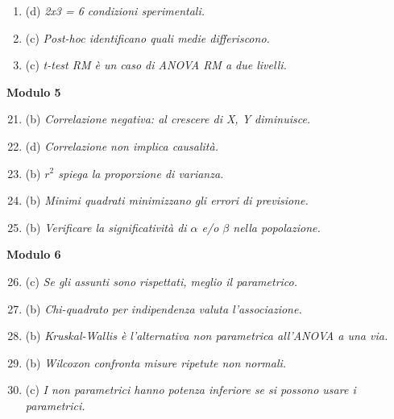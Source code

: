 \documentclass[12pt, a4paper]{article}
\begin{document}
\begin{footnotesize}
\begin{multicols}{2}
\begin{enumerate}
    \item (d) \textit{2x3 = 6 condizioni sperimentali.}
    \item (c) \textit{Post-hoc identificano quali medie differiscono.}
    \item (c) \textit{t-test RM è un caso di ANOVA RM a due livelli.}
\end{enumerate}
\vspace{0.5cm}
\textbf{Modulo 5}
\begin{enumerate}
    \setcounter{enumi}{20}
    \item (b) \textit{Correlazione negativa: al crescere di X, Y diminuisce.}
    \item (d) \textit{Correlazione non implica causalità.}
    \item (b) \textit{$r^2$ spiega la proporzione di varianza.}
    \item (b) \textit{Minimi quadrati minimizzano gli errori di previsione.}
    \item (b) \textit{Verificare la significatività di $\alpha$ e/o $\beta$ nella popolazione.}
\end{enumerate}
\vspace{0.5cm}
\textbf{Modulo 6}
\begin{enumerate}
    \setcounter{enumi}{25}
    \item (c) \textit{Se gli assunti sono rispettati, meglio il parametrico.}
    \item (b) \textit{Chi-quadrato per indipendenza valuta l'associazione.}
    \item (b) \textit{Kruskal-Wallis è l'alternativa non parametrica all'ANOVA a una via.}
    \item (b) \textit{Wilcoxon confronta misure ripetute non normali.}
    \item (c) \textit{I non parametrici hanno potenza inferiore se si possono usare i parametrici.}
\end{enumerate}
\end{multicols}
\end{footnotesize}
\end{document}
